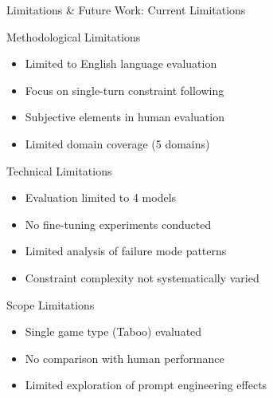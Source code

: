 \documentclass[aspectratio=169]{beamer}
\begin{document}
\begin{frame}{Limitations \& Future Work: Current Limitations}
\begin{block}{Methodological Limitations}
\begin{itemize}
    \item Limited to English language evaluation
    \item Focus on single-turn constraint following
    \item Subjective elements in human evaluation
    \item Limited domain coverage (5 domains)
\end{itemize}
\end{block}

\begin{block}{Technical Limitations}
\begin{itemize}
    \item Evaluation limited to 4 models
    \item No fine-tuning experiments conducted
    \item Limited analysis of failure mode patterns
    \item Constraint complexity not systematically varied
\end{itemize}
\end{block}

\begin{block}{Scope Limitations}
\begin{itemize}
    \item Single game type (Taboo) evaluated
    \item No comparison with human performance
    \item Limited exploration of prompt engineering effects
\end{itemize}
\end{block}
\end{frame}
\end{document}
